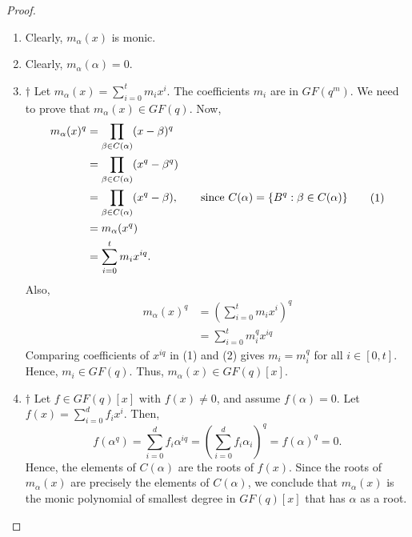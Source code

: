 \begin{proof} \;
    \begin{enumerate}[label=(\roman*)]
        \item Clearly, $ m_\alpha(x) $ is monic.
        \item Clearly, $ m_\alpha(\alpha)=0 $.
        \item $ \dagger $ Let $ m_\alpha(x)=\sum\limits_{i=0}^{t} m_i x^i $.
              The coefficients $ m_i $ are in $ GF(q^m) $. We need to prove that
              $ m_\alpha(x)\in GF(q) $. Now,
              \begin{equation}
                  \begin{aligned}
                      m_\alpha(x)^q
                       & =\prod_{\beta\in C(\alpha)}(x-\beta)^q                                                            \\
                       & =\prod_{\beta\in C(\alpha)}(x^q-\beta^q)                                                          \\
                       & =\prod_{\beta\in C(\alpha)}(x^q-\beta),\qquad \text{since }C(\alpha)=\{B^q:\beta\in C(\alpha)\} \\
                       & =m_\alpha(x^q)                                                                                    \\
                       & =\sum\limits_{i=0}^{t} m_i x^{iq}.
                  \end{aligned}\tag{1}
              \end{equation}
              Also,
              \begin{equation}
                  \begin{aligned}
                      m_\alpha(x)^q
                       & =\left( \sum\limits_{i=0}^{t} m_i x^i \right)^q \\
                       & = \sum\limits_{i=0}^{t} m_i^q x^{iq}
                  \end{aligned}\tag{2}
              \end{equation}
              Comparing coefficients of $ x^{iq} $ in (1) and (2) gives $ m_i=m_i^q $
              for all $ i\in[0,t] $. Hence, $ m_i\in GF(q) $. Thus, $ m_\alpha(x)\in GF(q)[x] $.
        \item $ \dagger $ Let $ f\in GF(q)[x] $ with $ f(x)\neq 0 $, and assume $ f(\alpha)=0 $.
              Let $ f(x)=\sum\limits_{i=0}^{d} f_i x^i $. Then,
              \[ f(\alpha^q)=\sum\limits_{i=0}^{d} f_i\alpha^{iq}=
                  \left( \sum\limits_{i=0}^{d} f_i\alpha_i \right)^q=f(\alpha)^q=0. \]
              Hence, the elements of $ C(\alpha) $ are the roots of $ f(x) $. Since the roots
              of $ m_\alpha(x) $ are precisely the elements of $ C(\alpha) $, we conclude
              that $ m_\alpha(x) $ is the monic polynomial of smallest degree in $ GF(q)[x] $
              that has $ \alpha $ as a root.
    \end{enumerate}
\end{proof}

